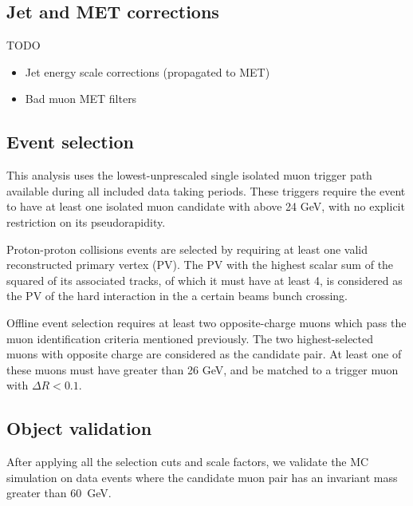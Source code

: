 \subsection{Jet and MET corrections}

TODO

\begin{itemize}
\item Jet energy scale corrections (propagated to MET)
\item Bad muon MET filters
\end{itemize}

\subsection{Event selection}

This analysis uses the lowest-\pt unprescaled single isolated muon trigger
path available during all included data taking periods.
These triggers require the event to have at least one isolated muon
candidate with \pt above 24 GeV, with no explicit restriction
on its pseudorapidity.

Proton-proton collisions events are selected by requiring at least
one valid reconstructed primary vertex (PV). The PV with the highest
scalar sum of the squared \pt of its associated tracks, of which
it must have at least 4, is considered as the PV of the hard interaction
in the a certain beams bunch crossing.

Offline event selection requires at least two opposite-charge muons
which pass the muon identification criteria mentioned previously.
The two highest-\pt selected muons with opposite charge are considered
as the \Htomm candidate pair.  At least one of these muons must have
\pt greater than 26 GeV, and be matched to a trigger muon with
$\Delta R < 0.1$.

\subsection{Object validation}

After applying all the selection cuts and scale factors, we validate the MC simulation
on data events where the candidate muon pair has an invariant mass greater than 60~GeV.

